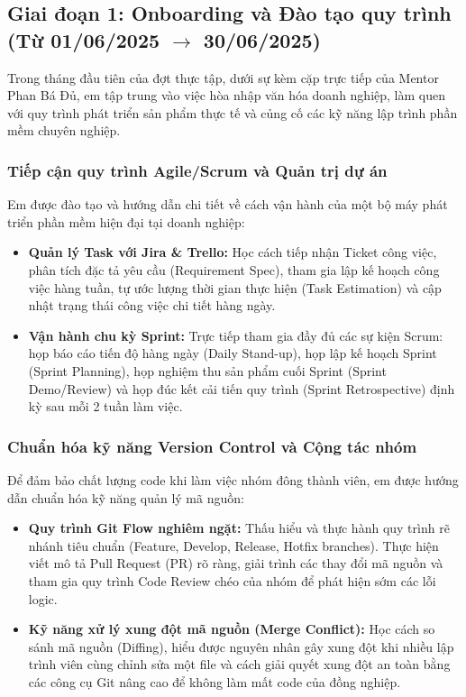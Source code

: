\documentclass[12pt, a4paper]{article}
\begin{document}
\subsection[Giai đoạn 1: Onboarding và Đào tạo quy trình (Từ 01/06/2025 đến 30/06/2025)]{Giai đoạn 1: Onboarding và Đào tạo quy trình \\(Từ 01/06/2025 $\rightarrow$ 30/06/2025)}
Trong tháng đầu tiên của đợt thực tập, dưới sự kèm cặp trực tiếp của Mentor Phan Bá Đủ, em tập trung vào việc hòa nhập văn hóa doanh nghiệp, làm quen với quy trình phát triển sản phẩm thực tế và củng cố các kỹ năng lập trình phần mềm chuyên nghiệp.

\subsubsection{Tiếp cận quy trình Agile/Scrum và Quản trị dự án}
Em được đào tạo và hướng dẫn chi tiết về cách vận hành của một bộ máy phát triển phần mềm hiện đại tại doanh nghiệp:
\begin{itemize}
    \item \textbf{Quản lý Task với Jira \& Trello:} Học cách tiếp nhận Ticket công việc, phân tích đặc tả yêu cầu (Requirement Spec), tham gia lập kế hoạch công việc hàng tuần, tự ước lượng thời gian thực hiện (Task Estimation) và cập nhật trạng thái công việc chi tiết hàng ngày.
    \item \textbf{Vận hành chu kỳ Sprint:} Trực tiếp tham gia đầy đủ các sự kiện Scrum: họp báo cáo tiến độ hàng ngày (Daily Stand-up), họp lập kế hoạch Sprint (Sprint Planning), họp nghiệm thu sản phẩm cuối Sprint (Sprint Demo/Review) và họp đúc kết cải tiến quy trình (Sprint Retrospective) định kỳ sau mỗi 2 tuần làm việc.
\end{itemize}

\subsubsection{Chuẩn hóa kỹ năng Version Control và Cộng tác nhóm}
Để đảm bảo chất lượng code khi làm việc nhóm đông thành viên, em được hướng dẫn chuẩn hóa kỹ năng quản lý mã nguồn:
\begin{itemize}
    \item \textbf{Quy trình Git Flow nghiêm ngặt:} Thấu hiểu và thực hành quy trình rẽ nhánh tiêu chuẩn (Feature, Develop, Release, Hotfix branches). Thực hiện viết mô tả Pull Request (PR) rõ ràng, giải trình các thay đổi mã nguồn và tham gia quy trình Code Review chéo của nhóm để phát hiện sớm các lỗi logic.
    \item \textbf{Kỹ năng xử lý xung đột mã nguồn (Merge Conflict):} Học cách so sánh mã nguồn (Diffing), hiểu được nguyên nhân gây xung đột khi nhiều lập trình viên cùng chỉnh sửa một file và cách giải quyết xung đột an toàn bằng các công cụ Git nâng cao để không làm mất code của đồng nghiệp.
\end{itemize}
\end{document}
